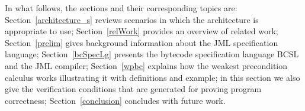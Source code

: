   
In what follows, the sections and their corresponding topics are: 
Section~\ref{architecture_s} reviews scenarios in which the architecture is appropriate to use; Section~\ref{relWork} provides an 
overview of related work; Section~\ref{prelim} gives background information about the JML specification language;  Section~\ref{bcSpecLg} presents the bytecode 
specification language BCSL and the JML compiler; Section~\ref{wpbc} explains how the weakest precondition calculus works illustrating it with definitions and example; in this section we also give the verification conditions that are generated for 
proving program correctness; %
Section~\ref{conclusion} concludes with future work.  















